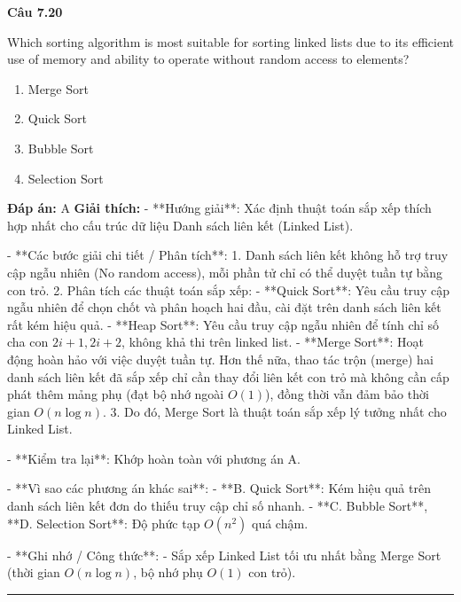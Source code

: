\documentclass[11pt,a4paper]{article}
\newenvironment{question}[1]{%
  \par\vspace{1em}\noindent\textbf{\large Câu #1}\par\vspace{0.4em}
}{%
  \par\vspace{1em}\hrule\vspace{0.6em}
}
\newenvironment{choices}{%
  \begin{enumerate}[label=\textbf{\Alph*.},leftmargin=2.2em,itemsep=2pt,topsep=3pt]
}{%
  \end{enumerate}
}
\newcommand{\choice}{\item}
\begin{document}
\begin{question}{7.20}
Which sorting algorithm is most suitable for sorting linked lists due to its efficient use of memory and ability to operate without random access to elements?
\begin{choices}
\choice Merge Sort
\choice Quick Sort
\choice Bubble Sort
\choice Selection Sort
\end{choices}
\textbf{Đáp án:} A
\textbf{Giải thích:} - **Hướng giải**:
  Xác định thuật toán sắp xếp thích hợp nhất cho cấu trúc dữ liệu Danh sách liên kết (Linked List).

- **Các bước giải chi tiết / Phân tích**:
  1. Danh sách liên kết không hỗ trợ truy cập ngẫu nhiên (No random access), mỗi phần tử chỉ có thể duyệt tuần tự bằng con trỏ.
  2. Phân tích các thuật toán sắp xếp:
     - **Quick Sort**: Yêu cầu truy cập ngẫu nhiên để chọn chốt và phân hoạch hai đầu, cài đặt trên danh sách liên kết rất kém hiệu quả.
     - **Heap Sort**: Yêu cầu truy cập ngẫu nhiên để tính chỉ số cha con \(2i+1, 2i+2\), không khả thi trên linked list.
     - **Merge Sort**: Hoạt động hoàn hảo với việc duyệt tuần tự. Hơn thế nữa, thao tác trộn (merge) hai danh sách liên kết đã sắp xếp chỉ cần thay đổi liên kết con trỏ mà không cần cấp phát thêm mảng phụ (đạt bộ nhớ ngoài \(O(1)\)), đồng thời vẫn đảm bảo thời gian \(O(n \log n)\).
  3. Do đó, Merge Sort là thuật toán sắp xếp lý tưởng nhất cho Linked List.

- **Kiểm tra lại**:
  Khớp hoàn toàn với phương án A.

- **Vì sao các phương án khác sai**:
  - **B. Quick Sort**: Kém hiệu quả trên danh sách liên kết đơn do thiếu truy cập chỉ số nhanh.
  - **C. Bubble Sort**, **D. Selection Sort**: Độ phức tạp \(O(n^2)\) quá chậm.

- **Ghi nhớ / Công thức**:
  - Sắp xếp Linked List tối ưu nhất bằng Merge Sort (thời gian \(O(n \log n)\), bộ nhớ phụ \(O(1)\) con trỏ).
\end{question}
\end{document}
